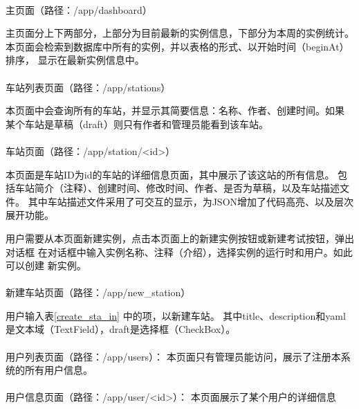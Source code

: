 \paragraph{} 主页面（路径：/app/dashboard）

主页面分上下两部分，上部分为目前最新的实例信息，下部分为本周的实例统计。
本页面会检索到数据库中所有的实例，并以表格的形式、以开始时间（beginAt）排序，
显示在最新实例信息中。

\paragraph{} 车站列表页面（路径：/app/stations）

本页面中会查询所有的车站，并显示其简要信息：名称、作者、创建时间。如果
某个车站是草稿（draft）则只有作者和管理员能看到该车站。

\paragraph{} 车站页面（路径：/app/station/<id>）

本页面是车站ID为id的车站的详细信息页面，其中展示了该这站的所有信息。
包括车站简介（注释）、创建时间、修改时间、作者、是否为草稿，以及车站描述文件。
其中车站描述文件采用了可交互的显示，为JSON增加了代码高亮、以及层次展开功能。

用户需要从本页面新建实例，点击本页面上的新建实例按钮或新建考试按钮，弹出对话框
在对话框中输入实例名称、注释（介绍），选择实例的运行时和用户。如此可以创建
新实例。

\paragraph{} 新建车站页面（路径：/app/new\_station）

用户输入表\ref{create_sta_in} 中的项，以新建车站。
其中title、description和yaml是文本域（TextField），draft是选择框（CheckBox）。

\paragraph{} 用户列表页面（路径：/app/users）：
本页面只有管理员能访问，展示了注册本系统的所有用户信息。

\paragraph{} 用户信息页面（路径：/app/user/<id>）：
本页面展示了某个用户的详细信息


